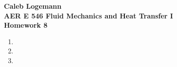 \documentclass[11pt, oneside]{article}
\begin{document}
\noindent \textbf{\Large{Caleb Logemann \\
AER E 546 Fluid Mechanics and Heat Transfer I \\
Homework 8
}}

%
\begin{enumerate}
  \item %


  \item %

  \item %

\end{enumerate}
\end{document}
